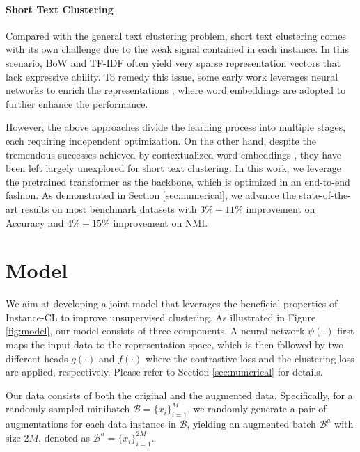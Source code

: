 \documentclass[11pt]{article}
\begin{document}
\paragraph{Short Text Clustering}{Compared with the general text clustering problem, short text clustering comes with its own challenge due to the weak signal contained in each instance. In this scenario, BoW and TF-IDF often yield very sparse representation vectors that lack expressive ability. To remedy this issue, some early work leverages neural networks to enrich the representations \citep{xu2017self, hadifar2019self}, where  word embeddings \citep{mikolov2013distributed, arora2016simple} are adopted to further enhance the performance. 

However, the above approaches divide the learning process into multiple stages, each requiring independent optimization. On the other hand, despite the tremendous successes achieved by contextualized word embeddings \citep{peters2018deep, devlin2019bert, radford2018improving, reimers2019sentence}, 
they have been left largely unexplored for short text clustering. In this work, we leverage the pretrained transformer as the backbone, which is optimized in an end-to-end fashion. As demonstrated in Section \ref{sec:numerical}, we advance the state-of-the-art results on most benchmark datasets with $3\%-11\%$ improvement on Accuracy and $4\%-15\%$ improvement on NMI.
}


\section{Model}
\label{sec:model}
We aim at developing a joint model that leverages the beneficial properties of
Instance-CL to improve unsupervised clustering. As illustrated in Figure \ref{fig:model}, our model consists of three components. A neural network $\psi(\cdot)$ first maps the input data to the representation space, which is then followed by two different heads $g(\cdot)$ and $f(\cdot)$ where the contrastive loss and the clustering loss are applied, respectively. Please refer to Section \ref{sec:numerical} for details. 


Our data consists of both the original and the augmented data. Specifically, for a randomly sampled minibatch $\mathcal{B}=\{x_i\}_{i=1}^{M}$,  we randomly generate a pair of augmentations for each data instance in $\mathcal{B}$, yielding an augmented batch $\mathcal{B}^a$ with size $2M$, denoted as $\mathcal{B}^a =\{\tilde{x}_i\}_{i=1}^{2M}$. 
\end{document}
